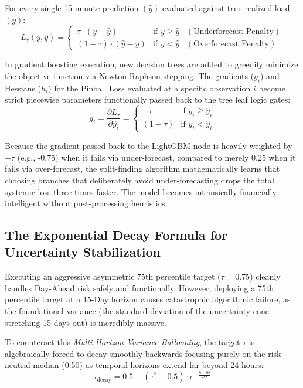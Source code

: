 \documentclass[11pt,a4paper]{article}
\begin{document}
For every single 15-minute prediction $(\hat{y})$ evaluated against true realized load $(y)$:
\begin{equation}
L_{\tau}(y, \hat{y}) = \begin{cases} 
      \tau \cdot (y - \hat{y}) & \text{if } y \geq \hat{y} \;\;\;(\text{Underforecast Penalty}) \\
      (1 - \tau) \cdot (\hat{y} - y) & \text{if } y < \hat{y} \;\;\;(\text{Overforecast Penalty})
   \end{cases}
\end{equation}

In gradient boosting execution, new decision trees are added to greedily minimize the objective function via Newton-Raphson stepping. The gradients ($g_i$) and Hessians ($h_i$) for the Pinball Loss evaluated at a specific observation $i$ become strict piecewise parameters functionally passed back to the tree leaf logic gates:
\begin{equation}
g_i = \frac{\partial L_{\tau}}{\partial \hat{y}_i} = \begin{cases} 
      -\tau & \text{if } y_i \geq \hat{y}_i \\
      (1 - \tau) & \text{if } y_i < \hat{y}_i
   \end{cases}
\end{equation}

Because the gradient passed back to the LightGBM node is heavily weighted by $-\tau$ (e.g., -0.75) when it fails via under-forecast, compared to merely $0.25$ when it fails via over-forecast, the split-finding algorithm mathematically learns that choosing branches that deliberately avoid under-forecasting drops the total systemic loss three times faster. The model becomes intrinsically financially intelligent without post-processing heuristics.

\subsection{The Exponential Decay Formula for Uncertainty Stabilization}
Executing an aggressive asymmetric 75th percentile target ($\tau = 0.75$) cleanly handles Day-Ahead risk safely and functionally. However, deploying a 75th percentile target at a 15-Day horizon causes catastrophic algorithmic failure, as the foundational variance (the standard deviation of the uncertainty cone stretching 15 days out) is incredibly massive.

To counteract this \textit{Multi-Horizon Variance Ballooning}, the target $\tau$ is algebraically forced to decay smoothly backwards focusing purely on the risk-neutral median (0.50) as temporal horizons extend far beyond 24 hours:
\begin{equation}
\tau_{\text{decay}} = 0.5 + (\tau^* - 0.5) \cdot e^{-\frac{h - 96}{288}}
\end{equation}
\end{document}

